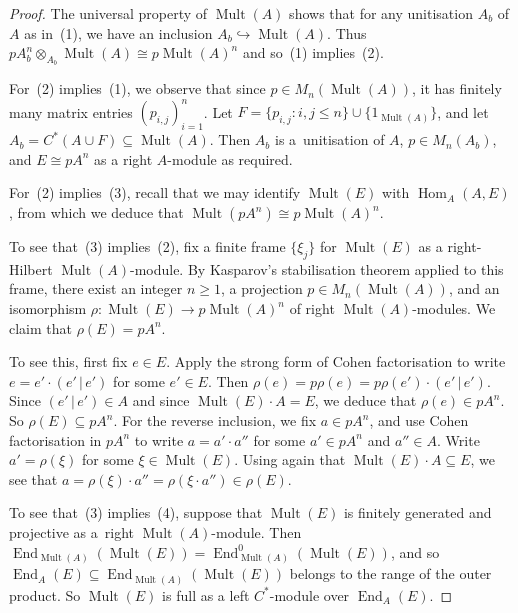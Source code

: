 \documentclass[pdftex]{sigma}
\numberwithin{equation}{section}
\DeclareMathOperator{\End}{End} %
\DeclareMathOperator{\Mult}{Mult} %
\newcommand{\ox}{\otimes} %
\begin{document}
\begin{proof}
The universal property of $\Mult(A)$ shows that for any unitisation $A_b$ of $A$ as in~(1), we have an inclusion $A_b\hookrightarrow\Mult(A)$. Thus $pA_b^n\ox_{A_b}\Mult(A)\cong p\Mult(A)^n$ and so~(1) implies~(2).

For~(2) implies~(1), we observe that since $p \in M_n(\Mult(A))$, it has f\/initely many matrix entries $(p_{i,j})^n_{i=1}$. Let $F = \{p_{i,j} \colon i,j \le n\} \cup \{1_{\Mult(A)}\}$, and let $A_b = C^*(A \cup F) \subseteq \Mult(A)$. Then $A_b$ is a~unitisation of $A$, $p \in M_n(A_b)$, and $E \cong p A^n$ as a right $A$-module as required.

For~(2) implies~(3), recall that we may identify $\Mult(E)$ with $\operatorname{Hom}_A(A,E)$, from which we deduce that $\Mult(pA^n)\cong p\Mult(A)^n$.

To see that~(3) implies~(2), f\/ix a f\/inite frame $\{\xi_j\}$ for $\Mult(E)$ as a right-Hilbert $\Mult(A)$-module. By Kasparov's stabilisation theorem applied to this frame, there exist an integer $n \ge 1$, a projection $p \in M_n(\Mult(A))$, and an isomorphism $\rho \colon \Mult(E) \to p\Mult(A)^n$ of right $\Mult(A)$-modules. We claim that $\rho(E) = pA^n$.

To see this, f\/irst f\/ix $e \in E$. Apply the strong form \cite[Proposition~2.31]{tfb} of Cohen factorisation to write $e = e' \cdot (e' \,|\, e')$ for some $e' \in E$. Then $\rho(e) = p \rho(e) = p \rho(e') \cdot(e' \,|\, e')$. Since $(e' \,|\, e') \in A$ and since $\Mult(E) \cdot A = E$, we deduce that $\rho(e) \in p A^n$. So $\rho(E) \subseteq pA^n$. For the reverse inclusion, we f\/ix $a \in p A^n$, and use Cohen factorisation in $p
A^n$ to write $a = a' \cdot a''$ for some $a' \in pA^n$ and $a'' \in A$. Write $a' = \rho(\xi)$ for some $\xi \in \Mult(E)$. Using again that $\Mult(E)\cdot A \subseteq E$, we see that $a = \rho(\xi)\cdot a'' = \rho(\xi \cdot a'') \in \rho(E)$.

To see that~(3) implies~(4), suppose that $\Mult(E)$ is f\/initely generated and projective as a~right $\Mult(A)$-module. Then $\End_{\Mult(A)}(\Mult(E)) = \End_{\Mult(A)}^0(\Mult(E))$, and so $\End_A(E) \subseteq \End_{\Mult(A)}(\Mult(E))$ belongs to the range of the outer product. So $\Mult(E)$ is full as a left $C^*$-module over $\End_A(E)$.


\end{proof}
\end{document}

